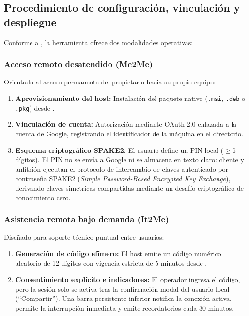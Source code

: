 \documentclass[12pt]{article}
\begin{document}
\subsection{Procedimiento de configuración, vinculación y despliegue}\label{sec:crdProcedimiento}

Conforme a \textcite{googleChromeRemoteDesktopHelp}, la herramienta ofrece dos modalidades operativas:

\subsubsection{Acceso remoto desatendido (Me2Me)}
Orientado al acceso permanente del propietario hacia su propio equipo:
\begin{enumerate}[noitemsep, topsep=4pt]
    \item \textbf{Aprovisionamiento del host:} Instalación del paquete nativo (\texttt{.msi}, \texttt{.deb} o \texttt{.pkg}) desde .
    \item \textbf{Vinculación de cuenta:} Autorización mediante OAuth 2.0 enlazada a la cuenta de Google, registrando el identificador de la máquina en el directorio.
    \item \textbf{Esquema criptográfico SPAKE2:} El usuario define un PIN local ($\ge 6$ dígitos). El PIN no se envía a Google ni se almacena en texto claro: cliente y anfitrión ejecutan el protocolo de intercambio de claves autenticado por contraseña SPAKE2 (\textit{Simple Password-Based Encrypted Key Exchange}), derivando claves simétricas compartidas mediante un desafío criptográfico de conocimiento cero.
\end{enumerate}

\subsubsection{Asistencia remota bajo demanda (It2Me)}
Diseñado para soporte técnico puntual entre usuarios:
\begin{enumerate}[noitemsep, topsep=4pt]
    \item \textbf{Generación de código efímero:} El host emite un código numérico aleatorio de 12 dígitos con vigencia estricta de 5 minutos desde .
    \item \textbf{Consentimiento explícito e indicadores:} El operador ingresa el código, pero la sesión solo se activa tras la confirmación modal del usuario local (\enquote{Compartir}). Una barra persistente inferior notifica la conexión activa, permite la interrupción inmediata y emite recordatorios cada 30 minutos.
\end{enumerate}
\end{document}
